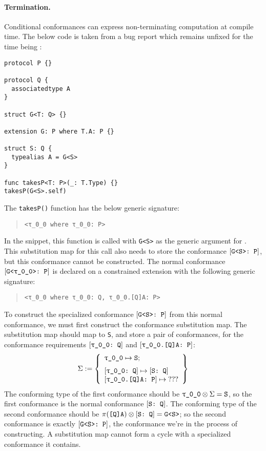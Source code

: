 \documentclass[../generics]{subfiles}
\begin{document}
\paragraph{Termination.}
Conditional conformances can express non-terminating computation at compile time. 
The below code is taken from a bug report which remains unfixed for the time being \cite{sr6724}:
\begin{Verbatim}
protocol P {}

protocol Q {
  associatedtype A
}

struct G<T: Q> {}

extension G: P where T.A: P {}

struct S: Q {
  typealias A = G<S>
}

func takesP<T: P>(_: T.Type) {}
takesP(G<S>.self)
\end{Verbatim}
The \texttt{takesP()} function has the below generic signature:
\begin{quote}
\begin{verbatim}
<τ_0_0 where τ_0_0: P>
\end{verbatim}
\end{quote}
In the snippet, this function is called with \texttt{G<S>} as the generic argument for . This substitution map for this call also needs to store the conformance $[\texttt{G<S>:~P}]$, but this conformance cannot be constructed. The normal conformance $\ConfReq{G<\ttgp{0}{0}>}{P}$ is declared on a constrained extension with the following generic signature:
\begin{quote}
\begin{verbatim}
<τ_0_0 where τ_0_0: Q, τ_0_0.[Q]A: P>
\end{verbatim}
\end{quote}
To construct the specialized conformance $[\texttt{G<S>:~P}]$ from this normal conformance, we must first construct the conformance substitution map. The substitution map should map  to \texttt{S}, and store a pair of conformances, for the conformance requirements $\ConfReq{\ttgp{0}{0}}{Q}$ and $\ConfReq{\ttgp{0}{0}.[Q]A}{P}$:
\[\Sigma := \SubstMapLongC{\SubstType{\ttgp{0}{0}}{S}}{
\SubstConf{\ttgp{0}{0}}{S}{Q}\\
\ConfReq{\ttgp{0}{0}.[Q]A}{P}\mapsto\text{???}
}\]
The conforming type of the first conformance should be $\ttgp{0}{0}\otimes\Sigma=\texttt{S}$, so the first conformance is the normal conformance $[\texttt{S:~Q}]$. The conforming type of the second conformance should be 
$\pi(\texttt{[Q]A})\otimes[\texttt{S:~Q}]=\texttt{G<S>}$; so the second conformance is exactly $[\texttt{G<S>:~P}]$, the conformance we're in the process of constructing. A substitution map cannot form a cycle with a specialized conformance it contains.
\end{document}
